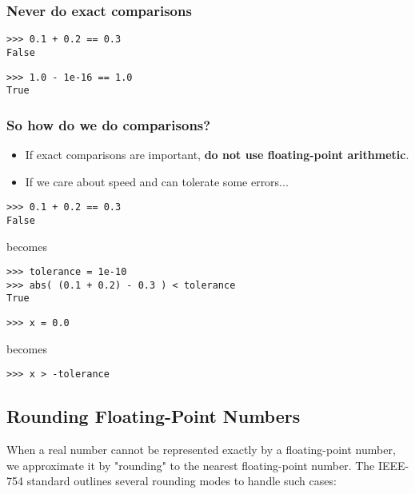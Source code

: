 \documentclass[12pt]{article}
\begin{document}
\subsubsection{Never do exact comparisons}

\begin{verbatim}
>>> 0.1 + 0.2 == 0.3
False
\end{verbatim}

\begin{verbatim}
>>> 1.0 - 1e-16 == 1.0
True
\end{verbatim}

\subsubsection{So how do we do comparisons?} %

\begin{itemize}
  \item If exact comparisons are important, \textbf{do not use floating-point arithmetic}.
  \item If we care about speed and can tolerate some errors...
\end{itemize}

\begin{verbatim}
>>> 0.1 + 0.2 == 0.3
False
\end{verbatim}

becomes

\begin{verbatim}
>>> tolerance = 1e-10
>>> abs( (0.1 + 0.2) - 0.3 ) < tolerance
True
\end{verbatim}

\begin{verbatim}
>>> x = 0.0
\end{verbatim}

becomes

\begin{verbatim}
>>> x > -tolerance
\end{verbatim}



\subsection{Rounding Floating-Point Numbers}
When a real number cannot be represented exactly by a floating-point number, we approximate it by "rounding" to the nearest floating-point number. The IEEE-754 standard outlines several rounding modes to handle such cases:
\end{document}
